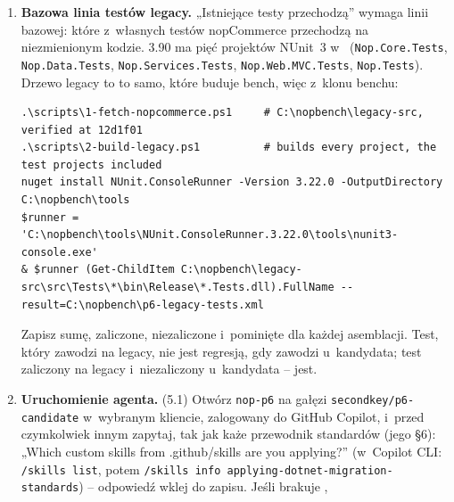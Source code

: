 \begin{enumerate}
\begin{lstlisting}
# 3.2 Copy every generated skill into the target's .github/skills/.
mkdir -p .github/skills
cp -R ../standards/generated/skills/. .github/skills/
git -C ../standards rev-parse HEAD             # the standards commit, for the record

# 3.3 Commit it alone, on the base branch.
git add .github/skills
git commit -m "Add Second Key standards skills (<standards-tag>, <standards-commit>)"
git push -u fork secondkey/p6-base
git checkout -b secondkey/p6-candidate
git push -u fork secondkey/p6-candidate
\end{lstlisting}
    Każdy skill to katalog z~; Copilot odkrywa skille w~
    otwartego repozytorium. Nie edytuj ich tutaj -- zmiana standardu to zmiana R4.
  \item \textbf{Bazowa linia testów legacy.} „Istniejące testy przechodzą” wymaga linii
    bazowej: które z~własnych testów nopCommerce przechodzą na niezmienionym kodzie. 3.90
    ma pięć projektów NUnit~3 w~ (\texttt{Nop.Core.Tests},
    \texttt{Nop.Data.Tests}, \texttt{Nop.Services.Tests}, \texttt{Nop.Web.MVC.Tests},
    \texttt{Nop.Tests}). Drzewo legacy to to samo, które buduje bench, więc z~klonu benchu:
\begin{lstlisting}
.\scripts\1-fetch-nopcommerce.ps1     # C:\nopbench\legacy-src, verified at 12d1f01
.\scripts\2-build-legacy.ps1          # builds every project, the test projects included
nuget install NUnit.ConsoleRunner -Version 3.22.0 -OutputDirectory C:\nopbench\tools
$runner = 'C:\nopbench\tools\NUnit.ConsoleRunner.3.22.0\tools\nunit3-console.exe'
& $runner (Get-ChildItem C:\nopbench\legacy-src\src\Tests\*\bin\Release\*.Tests.dll).FullName --result=C:\nopbench\p6-legacy-tests.xml
\end{lstlisting}
    Zapisz sumę, zaliczone, niezaliczone i~pominięte dla każdej asemblacji. Test, który
    zawodzi na legacy, nie jest regresją, gdy zawodzi u~kandydata; test zaliczony na legacy
    i~niezaliczony u~kandydata -- jest.
  \item \textbf{Uruchomienie agenta.} (5.1) Otwórz \texttt{nop-p6} na gałęzi
    \texttt{secondkey/p6-candidate} w~wybranym kliencie, zalogowany do GitHub Copilot,
    i~przed czymkolwiek innym zapytaj, tak jak każe przewodnik standardów (jego §6):
    „Which custom skills from .github/skills are you applying?” (w~Copilot CLI:
    \texttt{/skills list}, potem \texttt{/skills info applying-dotnet-migration-standards})
    -- odpowiedź wklej do zapisu. Jeśli brakuje ,

\end{enumerate}
